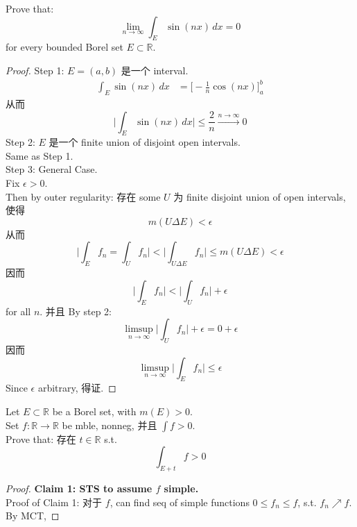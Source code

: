 \documentclass[lang=cn,11pt]{elegantbook}
\begin{document}
\begin{example}
    Prove that: \[
    \lim_{n\to \infty} \int_E \sin (nx)\, dx = 0
    \]for every bounded Borel set $E \subset \mathbb{R}$.\\
\begin{proof}
    Step 1: $E = (a,b)$ 是一个 interval.\\
    \begin{align*}
        \int_E \sin (nx)\,d x  & = \bigg[ -\frac{1}{n} \cos (nx)   \bigg]_a^b
    \end{align*}
    从而 \[
       \bigg|   \int_E \sin (nx)\,d x  \bigg| \leq \frac{2}{n} \overset{n\to \infty}{\longrightarrow } 0
    \]
    Step 2: $E$ 是一个 finite union of disjoint open intervals.\\
    Same as Step 1.\\
    Step 3: General Case.\\
    Fix $\epsilon > 0$.\\
    Then by outer regularity: 存在 some $U$ 为 finite disjoint union of open intervals, 使得 \[
    m(U \Delta E ) < \epsilon
    \]
    从而 \[
\bigg| \int_E f_n = \int_U f_n   \bigg| < \bigg|\int_{U \Delta E} f_n\bigg| \leq m(U \Delta E) < \epsilon
    \]因而\[
 \bigg|\int_{ E} f_n\bigg|  <   \bigg|\int_{ U} f_n\bigg| + \epsilon
    \]for all $n$. 并且 By step 2: \[
    \limsup_{n\to \infty} \bigg | \int _U f_n \bigg| + \epsilon = 0 + \epsilon
    \]
    因而 \[    \limsup_{n\to \infty} \bigg | \int _E f_n \bigg| \leq \epsilon \]
    Since $\epsilon$ arbitrary, 得证.
\end{proof}
\end{example}






\begin{example}
    Let $E \subset \mathbb{R}$ be a Borel set, with $m(E) > 0$.\\
    Set $f: \mathbb{R}\to \mathbb{R}$ be mble, nonneg, 并且 $\int f > 0$.\\
    Prove that: 存在 $t \in \mathbb{R}$ s.t. $$\int_{E + t} f > 0$$
    \begin{proof}
\textbf{Claim 1: STS to assume $f$ simple.}\\
Proof of Claim 1: 对于 $f$, can find seq of simple functions $0 \leq f_n \leq f$, s.t. $f_n \nearrow f$.\\
By MCT, 
    \end{proof}
\end{example}
\end{document}
